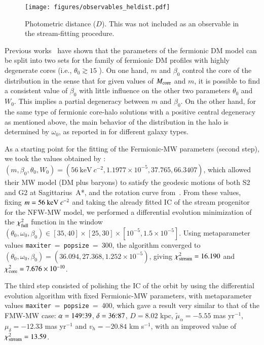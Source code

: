 \documentclass[twocolumn]{aa}
\begin{document}
\begin{figure}
   \texttt{[image: figures/observables\_heldist.pdf]}
   \caption{Photometric distance ($D$). This was not included as an observable in the stream-fitting procedure.}
   \label{fig:obs_radial}
\end{figure}
Previous works~\citep{arguelles_novel_2018,2019PDU....24..278A,2023ApJ...945....1K} have shown that the parameters of the fermionic DM model can be split into two sets for the family of fermionic DM profiles with highly degenerate cores (i.e., $\theta_0 \gtrsim 15$ \citealp{2019PDU....24..278A}). On one hand, $m$ and $\beta_0$ control the core of the distribution in the sense that for given values of $M_{\rm{core}}$ and $m$, it is possible to find a consistent value of $\beta_0$ with little influence on the other two parameters $\theta_0$ and $W_0$. This implies a partial degeneracy between $m$ and $\beta_0$.
On the other hand, for the same type of fermionic core-halo solutions with a positive central degeneracy as mentioned above, the main behavior of the distribution in the halo is determined by $\omega_0$, as reported in \cite{2019PDU....24..278A} for different galaxy types.

As a starting point for the fitting of the Fermionic-MW parameters (second step), we took the values obtained by \citet{2020A&A...641A..34B}: $(m, \beta_0, \theta_0, W_0)=(56~\mathrm{keV}~c^{-2}, 1.1977\times10^{-5}, 37.765, 66.3407)$, which allowed their MW model (DM plus baryons) to satisfy the geodesic motions of both S2 and G2 at Sagittarius~A*, and the rotation curve from~\citet{sofue_rotation_2013}.
From these values, fixing $m=56~{\rm{keV}}~c^{-2}$ and taking the already fitted IC of the stream progenitor for the NFW-MW model, we performed a differential evolution minimization of the
$\chi^2_{\rm{full}}$ function in the window
$(\theta_0,\omega_0, \beta_0)\in [35, 40]\times[25, 30]\times[10^{-5}, 1.5\times10^{-5}]$. Using metaparameter values \texttt{maxiter}$~=~$\texttt{popsize}$~=~$300, the algorithm converged to
$(\theta_0, \omega_0, \beta_0)= (36.094, 27.368 , 1.252\times10^{-5})$, giving
$\chi^2_{\rm{stream}}= 16.190$ and  $\chi^2_{\rm{core}}= 7.676\times10^{-10}$.

The third step consisted of polishing the IC of the orbit by using the differential evolution algorithm with fixed Fermionic-MW parameters, with metaparameter values \texttt{maxiter}$~=~$\texttt{popsize}$~=~$400, which gave a result very similar to that of the FMW-MW case:
$\alpha=149\overset{\circ}{.} 39$, $\delta=36\overset{\circ}{.} 87$, $D=8.02$ kpc,
$\tilde{\mu}_\alpha=-5.55$ mas yr$^{-1}$, $\mu_\delta=-12.33$ mas yr$^{-1}$ and $v_h=-20.84$ km s$^{-1}$, with an improved value of $\chi^2_{\rm{stream}}= 13.59$.
\end{document}
